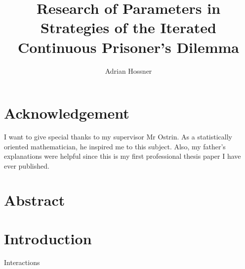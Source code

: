 \documentclass{article}
\title{Research of Parameters in Strategies of the Iterated Continuous Prisoner's Dilemma}
\author{Adrian Hossner}
\date{ } %
\begin{document}
\maketitle

\newpage

\section{Acknowledgement}
I want to give special thanks to my supervisor Mr Ostrin.
As a statistically oriented mathematician, he inspired me to this subject.
Also, my father's explanations were helpful since this is my first professional thesis paper I have ever published.

\newpage

\tableofcontents
\newpage

\section*{Abstract}


\section{Introduction}
Interactions 
\end{document}
